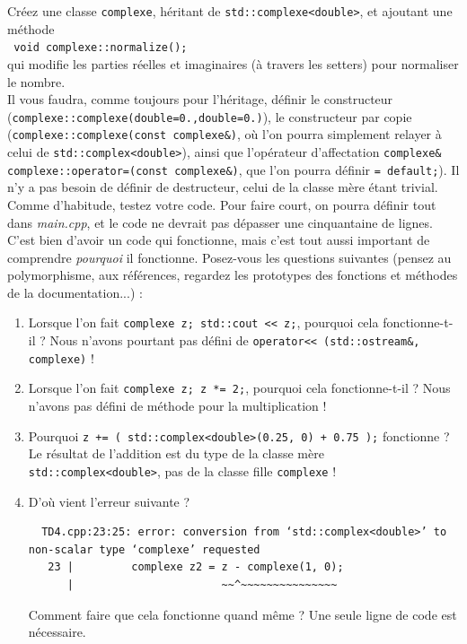 \documentclass{book}
\newcommand{\inline}[1]{\texttt{#1}}
\def\filename{\emph}
\begin{document}
Créez une classe \inline{complexe}, héritant de \inline{std::complexe<double>}, et ajoutant une méthode\\
\inline{  void complexe::normalize();}\\
qui modifie les parties réelles et imaginaires (à travers les setters) pour normaliser le nombre.\\

Il vous faudra, comme toujours pour l'héritage, définir le constructeur (\inline{complexe::complexe(double=0.,double=0.)}), le constructeur par copie (\inline{complexe::complexe(const complexe&)}, où l'on pourra simplement relayer à celui de \inline{std::complex<double>}), ainsi que l'opérateur d'affectation \inline{complexe& complexe::operator=(const complexe&)}, que l'on pourra définir \inline{= default;}). Il n'y a pas besoin de définir de destructeur, celui de la classe mère étant trivial. Comme d'habitude, testez votre code. Pour faire court, on pourra définir tout dans \filename{main.cpp}, et le code ne devrait pas dépasser une cinquantaine de lignes.\\

C'est bien d'avoir un code qui fonctionne, mais c'est tout aussi important de comprendre \emph{pourquoi} il fonctionne. Posez-vous les questions suivantes (pensez au polymorphisme, aux références, regardez les prototypes des fonctions et méthodes de la documentation...) :
\begin{enumerate}

  \item Lorsque l'on fait \inline{complexe z; std::cout << z;}, pourquoi cela fonctionne-t-il ? Nous n'avons pourtant pas défini de \inline{operator<< (std::ostream&, complexe)} !

  \item Lorsque l'on fait \inline{complexe z; z *= 2;}, pourquoi cela fonctionne-t-il ? Nous n'avons pas défini de méthode pour la multiplication !

  \item Pourquoi \inline{z += ( std::complex<double>(0.25, 0) + 0.75 );} fonctionne ? Le résultat de l'addition est du type de la classe mère \inline{std::complex<double>}, pas de la classe fille \inline{complexe} !

  \item D'où vient l'erreur suivante ?
\begin{verbatim}
  TD4.cpp:23:25: error: conversion from ‘std::complex<double>’ to non-scalar type ‘complexe’ requested
   23 |         complexe z2 = z - complexe(1, 0);
      |                       ~~^~~~~~~~~~~~~~~~
\end{verbatim}
  Comment faire que cela fonctionne quand même ? Une seule ligne de code est nécessaire.

\end{enumerate}
\end{document}
